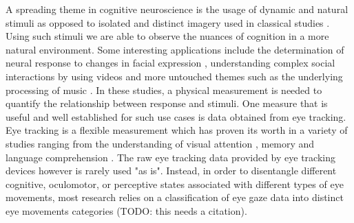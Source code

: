A spreading theme in cognitive neuroscience is the usage of dynamic and natural stimuli as opposed to isolated and distinct imagery used in classical studies \citep{real_world}. Using such stimuli we are able to observe the nuances of cognition in a more natural environment. Some interesting applications include the determination of neural response to changes in facial expression \citep{Harris2014}, understanding complex social interactions by using videos \citep{Tikka2012} and more untouched themes such as the underlying processing of music \citep{Toiviainen2014}. In these studies, a physical measurement is needed to quantify the relationship between response and stimuli. One measure that is useful and well established for such use cases is data obtained from eye tracking. Eye tracking is a flexible measurement which has proven its worth in a variety of studies ranging from the understanding of visual attention \citep{HantaoLiu2011}, memory \citep{Hannula2010} and language comprehension \citep{Gordon2006}. The raw eye tracking data provided by eye tracking devices however is rarely used "as is". Instead, in order to disentangle different cognitive, oculomotor, or perceptive states associated with different types of eye movements, most research relies on a classification of eye gaze data into distinct eye movements categories (TODO: this needs a citation). \\
